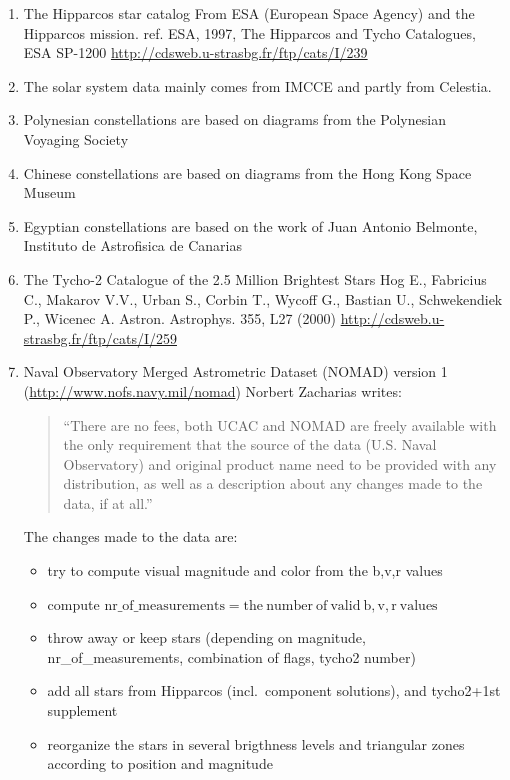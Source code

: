 \begin{enumerate}
\item The Hipparcos star catalog
    From ESA (European Space Agency) and the Hipparcos mission. ref. ESA, 1997, The Hipparcos and Tycho Catalogues, ESA SP-1200 \url{http://cdsweb.u-strasbg.fr/ftp/cats/I/239}
\item The solar system data mainly comes from IMCCE and partly from Celestia.
\item Polynesian constellations are based on diagrams from the Polynesian Voyaging Society
\item Chinese constellations are based on diagrams from the Hong Kong Space Museum
\item Egyptian constellations are based on the work of Juan Antonio Belmonte, Instituto de Astrofisica de Canarias
\item The Tycho-2 Catalogue of the 2.5 Million Brightest Stars Hog E., Fabricius C., Makarov V.V., Urban S., Corbin T., Wycoff G., Bastian U., Schwekendiek P., Wicenec A.
    Astron. Astrophys. 355, L27 (2000)
    \url{http://cdsweb.u-strasbg.fr/ftp/cats/I/259}
\item Naval Observatory Merged Astrometric Dataset (NOMAD) version 1 (\url{http://www.nofs.navy.mil/nomad})
    Norbert Zacharias writes:
	\begin{quotation}
    ``There are no fees, both UCAC and NOMAD are freely available with the only requirement that the source of the data (U.S.
    Naval Observatory) and original product name need to be provided with any distribution, as well as a description about any
    changes made to the data, if at all.''
	\end{quotation}
    The changes made to the data are:
	\begin{itemize}
    \item try to compute visual magnitude and color from the b,v,r values
    \item compute $\mathrm{nr\_of\_measurements} = \mathrm{the\ number\ of\ valid\ b,v,r\ values}$
    \item throw away or keep stars (depending on magnitude, nr\_of\_measurements, combination of flags, tycho2 number)
    \item add all stars from Hipparcos (incl.\ component solutions), and tycho2+1st supplement
    \item reorganize the stars in several brigthness levels and triangular zones according to position and magnitude

\end{itemize}
\end{enumerate}
